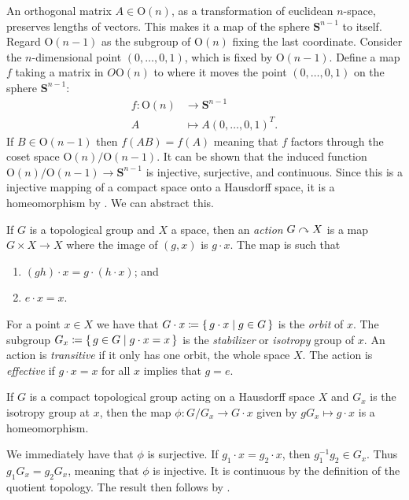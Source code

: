 \documentclass[letterpaper, 11pt, oneside]{book}
\begin{document}
\clearpage

An orthogonal matrix $A \in \text{O}(n)$, as a transformation of euclidean $n$-space, preserves lengths of vectors.
This makes it a map of the sphere $\textbf{S}^{n - 1}$ to itself.
Regard $\text{O}(n - 1)$ as the subgroup of $\text{O}(n)$ fixing the last coordinate.
Consider the $n$-dimensional point $(0, \ldots, 0, 1)$, which is fixed by $\text{O}(n - 1)$.
Define a map $f$ taking a matrix in $O\text{O}(n)$ to where it moves the point $(0, \ldots, 0, 1)$ on the sphere $\textbf{S}^{n - 1}$:
\begin{align*}
  f\colon \text{O}(n) &\to \textbf{S}^{n - 1} \\
             A &\mapsto A (0, \ldots, 0, 1)^{T}.
\end{align*}
If $B \in \text{O}(n - 1)$ then $f(AB) = f(A)$ meaning that $f$ factors through the coset space $\text{O}(n) / \text{O}(n - 1)$.
It can be shown that the induced function $\text{O}(n) / \text{O}(n - 1) \to \textbf{S}^{n - 1}$ is injective, surjective, and continuous.
Since this is a injective mapping of a compact space onto a Hausdorff space, it is a homeomorphism by .
We can abstract this.

\begin{defn}
  If $G$ is a topological group and $X$ a space, then an \emph{action} $G \curvearrowright X$ is a map $G \times X \to X$ where the image of $(g, x)$ is $g \cdot x$.
  The map is such that
  \begin{enumerate}
  \item $(gh) \cdot x = g \cdot (h \cdot x)$; and
  \item $e \cdot x = x$.
  \end{enumerate}
  For a point $x \in X$ we have that $G \cdot x \coloneqq \set{g \cdot x | g \in G}$ is the \emph{orbit} of $x$.
  The subgroup $G_{x} \coloneqq \set{g \in G | g \cdot x = x}$ is the \emph{stabilizer} or \emph{isotropy} group of $x$.
  An action is \emph{transitive} if it only has one orbit, the whole space $X$.
  The action is \emph{effective} if $g \cdot x = x$ for all $x$ implies that $g = e$.
\end{defn}

\begin{prop}
  If $G$ is a compact topological group acting on a Hausdorff space $X$ and $G_{x}$ is the isotropy group at $x$, then the map $\phi\colon G / G_{x} \to G \cdot x$ given by $g G_{x} \mapsto g \cdot x$ is a homeomorphism.
\end{prop}
\begin{pf}
  We immediately have that $\phi$ is surjective.
  If $g_{1} \cdot x = g_{2} \cdot x$, then $g_{1}^{-1} g_{2} \in G_{x}$.
  Thus $g_{1} G_{x} = g_{2} G_{x}$, meaning that $\phi$ is injective.
  It is continuous by the definition of the quotient topology.
  The result then follows by .
\end{pf}
\end{document}
